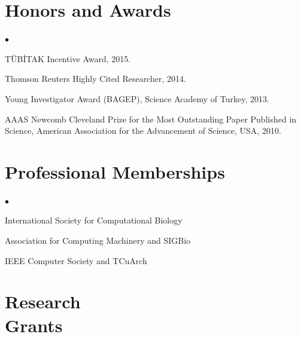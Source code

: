 \documentclass[margin,line]{res}
\newenvironment{list2}{
  \begin{list}{$\bullet$}{%
      \setlength{\itemsep}{0in}
      \setlength{\parsep}{0in} \setlength{\parskip}{0in}
      \setlength{\topsep}{0in} \setlength{\partopsep}{0in} 
      \setlength{\leftmargin}{0.2in}}}{\end{list}}
\newcommand{\junk}[1]{}
\begin{document}
\begin{resume}
          \section{\sc Honors and Awards} 
          \begin{list2}
            \junk{
            \item
              Ranked 36$^{th}$ among 1.2 million examinees in the Nationwide University
              Entrance Examinations in ~Turkey, 1996.
            \item
              Ranked 40$^{th}$ in the Nationwide Post-Graduate Education Examination in Turkey, 1999.
            }
          \item
            TÜBİTAK Incentive Award, 2015.
          \item
            Thomson Reuters Highly Cited Researcher, 2014.
          \item
            Young Investigator Award (BAGEP), Science Academy of Turkey, 2013.
          \item
            AAAS Newcomb Cleveland Prize for the Most Outstanding Paper Published in Science, American Association for the Advancement of Science, USA, 2010.
          \end{list2}
          

\vspace*{-.2cm}
\section{\sc Professional Memberships}
\begin{list2}
\item 
  International Society for Computational Biology%
\item
  Association for Computing Machinery and SIGBio
\item
  IEEE Computer Society and TCuArch
\end{list2}

\clearpage

          \section{\sc Research \\ Grants}
                                       \vspace{-0.4cm}

\end{resume}
\end{document}
